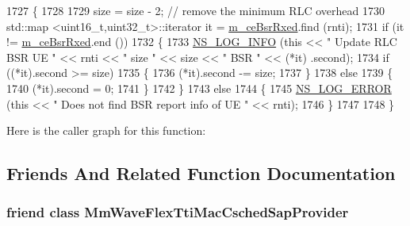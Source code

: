 \begin{DoxyCode}
1727 \{
1728 
1729   size = size - 2; \textcolor{comment}{// remove the minimum RLC overhead}
1730   std::map <uint16\_t,uint32\_t>::iterator it = \hyperlink{classns3_1_1MmWaveFlexTtiMacScheduler_a3f24f21e6b97c5f90be970f6f8b3bffa}{m\_ceBsrRxed}.find (rnti);
1731   \textcolor{keywordflow}{if} (it != \hyperlink{classns3_1_1MmWaveFlexTtiMacScheduler_a3f24f21e6b97c5f90be970f6f8b3bffa}{m\_ceBsrRxed}.end ())
1732     \{
1733       \hyperlink{group__logging_gafbd73ee2cf9f26b319f49086d8e860fb}{NS\_LOG\_INFO} (\textcolor{keyword}{this} << \textcolor{stringliteral}{" Update RLC BSR UE "} << rnti << \textcolor{stringliteral}{" size "} << size << \textcolor{stringliteral}{" BSR "} << (*it)
      .second);
1734       \textcolor{keywordflow}{if} ((*it).second >= size)
1735         \{
1736           (*it).second -= size;
1737         \}
1738       \textcolor{keywordflow}{else}
1739         \{
1740           (*it).second = 0;
1741         \}
1742     \}
1743   \textcolor{keywordflow}{else}
1744     \{
1745       \hyperlink{group__logging_ga0261a8db1d4ac5f79417d117634fd455}{NS\_LOG\_ERROR} (\textcolor{keyword}{this} << \textcolor{stringliteral}{" Does not find BSR report info of UE "} << rnti);
1746     \}
1747 
1748 \}
\end{DoxyCode}


Here is the caller graph for this function\+:




\subsection{Friends And Related Function Documentation}
\subsubsection[{\texorpdfstring{Mm\+Wave\+Flex\+Tti\+Mac\+Csched\+Sap\+Provider}{MmWaveFlexTtiMacCschedSapProvider}}]{\setlength{\rightskip}{0pt plus 5cm}friend class {\bf Mm\+Wave\+Flex\+Tti\+Mac\+Csched\+Sap\+Provider}\hspace{0.3cm}{\ttfamily [friend]}}\hypertarget{classns3_1_1MmWaveFlexTtiMacScheduler_a96a50df5c19790a6de7fa5203974e459}{}\label{classns3_1_1MmWaveFlexTtiMacScheduler_a96a50df5c19790a6de7fa5203974e459}
